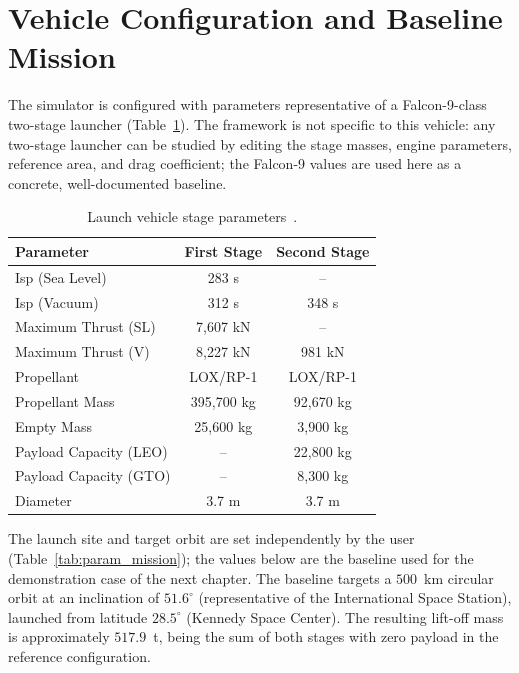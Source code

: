 \section{Vehicle Configuration and Baseline Mission}
\label{sec:vehicle}

The simulator is configured with parameters representative of a Falcon-9-class
two-stage launcher (Table~\ref{tab:stage_params}). The framework is not specific
to this vehicle: any two-stage launcher can be studied by editing the stage
masses, engine parameters, reference area, and drag coefficient; the Falcon-9
values are used here as a concrete, well-documented baseline.

\begin{table}[ht]
\centering
\caption{Launch vehicle stage parameters~\cite{NASA_Falcon9v12_Datasheet_2018,
SpaceX_Falcon9_2025, Wevolver_Falcon9v12_Block5_2019}.}
\label{tab:stage_params}
\begin{tabular}{lcc}
\hline
\textbf{Parameter} & \textbf{First Stage} & \textbf{Second Stage} \\
\hline
Isp (Sea Level)          & 283 s        & --       \\
Isp (Vacuum)             & 312 s        & 348 s    \\
Maximum Thrust (SL)      & 7{,}607 kN    & --       \\
Maximum Thrust (V)       & 8{,}227 kN    & 981 kN   \\
Propellant               & LOX/RP-1      & LOX/RP-1 \\
Propellant Mass          & 395{,}700 kg  & 92{,}670 kg \\
Empty Mass               & 25{,}600 kg   & 3{,}900 kg \\
Payload Capacity (LEO)   & --           & 22{,}800 kg \\
Payload Capacity (GTO)   & --           & 8{,}300 kg \\
Diameter                 & 3.7 m        & 3.7 m    \\
\hline
\end{tabular}
\end{table}

The launch site and target orbit are set independently by the user
(Table~\ref{tab:param_mission}); the values below are the baseline used for the
demonstration case of the next chapter. The baseline targets a $500$~km circular
orbit at an inclination of $51.6^\circ$ (representative of the International Space
Station), launched from latitude $28.5^\circ$ (Kennedy Space Center). The
resulting lift-off mass is approximately $517.9$~t, being the sum of both stages
with zero payload in the reference configuration.

